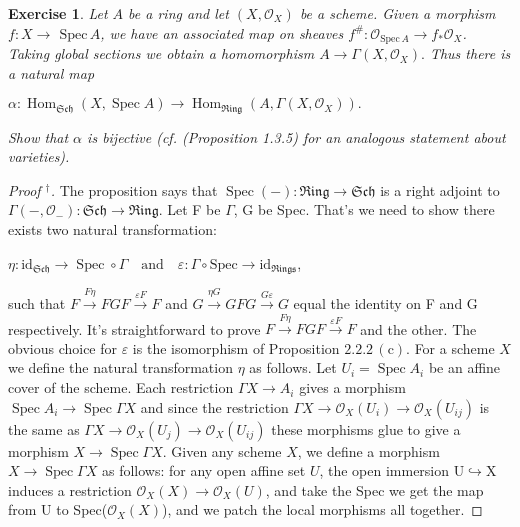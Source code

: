 \documentclass[12pt]{amsart}
\newtheorem{exe}{Exercise}[subsection]
\begin{document}
\begin{exe}
	\label{2.2.4}
Let $A$ be a ring and let $(X, \mathcal{O}_{X}) $ be a scheme. Given a morphism $f: X \rightarrow$ $\mathrm{Spec}\, A$, we have an associated map on sheaves $f^{\#}: \mathcal{O}_{\mathrm{Spec}\, A} \rightarrow f_{*} \mathcal{O}_{X}$. Taking global sections we obtain a homomorphism $A \rightarrow \Gamma\left(X, \mathcal{O}_{X}\right) .$ Thus there is a natural map 
\begin{center}
	$\alpha: \operatorname{Hom}_{\mathfrak{S c h}}(X, \operatorname{Spec} A) \rightarrow \operatorname{Hom}_{\mathfrak{R i n g}}\left(A, \Gamma\left(X, \mathcal{O}_{X}\right)\right).$
\end{center}
Show that $\alpha$ is bijective \textup{(cf. (Proposition 1.3.5) for an analogous statement about varieties)}.
\end{exe}
\begin{proof}[Proof $^\dag$]
The proposition says that $\operatorname{Spec}(-):\mathfrak{R i n g} \rightarrow \mathfrak{Sch} $ is a right adjoint to $\Gamma\left(-, \mathcal{O}_{-}\right): \mathfrak{S c h} \rightarrow \mathfrak{R i n g}$.  Let F be $\Gamma$, G be Spec. That's we need to show there exists two natural transformation:  
\begin{center}
	$\eta: \mathrm{i d}_{\mathfrak{S c h}} \rightarrow \operatorname{Spec} \circ \Gamma\quad \text{and}\quad \varepsilon:\Gamma \circ \mathrm{Spec} \rightarrow  \mathrm{i d}_{\mathfrak{Rings}}$, \end{center}  such that
$F \xrightarrow{F \eta} F G F \xrightarrow{\varepsilon F} F$ and $G \xrightarrow{\eta G}G F G \xrightarrow{G \varepsilon} G$ equal the identity on F and G respectively. It's straightforward to prove $F \xrightarrow{F \eta} F G F \xrightarrow{\varepsilon F} F$ and the other. The obvious choice for $\varepsilon$ is the isomorphism of Proposition $2.2.2\,(\mathrm{c})$.  For a scheme $X$ we define the natural transformation $\eta$ as follows. Let $U_{i}=\operatorname{Spec} A_{i}$ be an affine cover of the scheme. Each restriction $\Gamma X \rightarrow A_{i}$ gives a morphism $\operatorname{Spec} A_{i} \rightarrow \operatorname{Spec} \Gamma X$ and since the restriction $\Gamma X \rightarrow \mathcal{O}_{X}\left(U_{i}\right) \rightarrow \mathcal{O}_{X}\left(U_{i j}\right)$ is the
same as $\Gamma X \rightarrow \mathcal{O}_{X}\left(U_{j}\right) \rightarrow \mathcal{O}_{X}\left(U_{i j}\right)$ these morphisms glue to give a morphism $X \rightarrow \operatorname{Spec} \Gamma X$. Given any scheme $X$, we define a morphism $X \rightarrow \operatorname{Spec} \Gamma X$ as follows: for any open affine set $U$, the open immersion U$\hookrightarrow$X induces a restriction $\mathcal{O}_{X}(X)\rightarrow \mathcal{O}_{X}(U)$, and take the Spec we get the map from U to Spec($\mathcal{O}_{X}(X)$), and we patch the local morphisms all together.
\end{proof}
\end{document}
